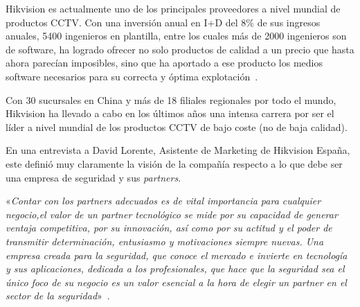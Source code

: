 Hikvision es actualmente uno de los principales proveedores a nivel mundial de productos \acs{CCTV}. Con una inversión anual en \acs{I+D} del 8\% de sus ingresos anuales, 5400 ingenieros en plantilla, entre los cuales más de 2000 ingenieros son de software, ha logrado ofrecer no solo productos de calidad a un precio que hasta ahora parecían imposibles, sino que ha aportado a ese producto los medios software necesarios para su correcta y óptima explotación~\cite{HikEurope}.

Con 30 sucursales en China y más de 18 filiales regionales por todo el mundo, Hikvision ha llevado a cabo en los últimos años una intensa carrera por ser el líder a nivel mundial de los productos \acs{CCTV} de bajo coste (no de baja calidad).

En una entrevista a David Lorente, Asistente de Marketing de Hikvision España, este definió muy claramente la visión de la compañía respecto a lo que debe ser una empresa de seguridad y sus \textit{partners}.


«\textit{Contar con los partners adecuados es de vital importancia para cualquier negocio,el valor de un partner tecnológico se mide por su capacidad de generar ventaja competitiva, por su innovación, así como por su actitud y el poder de transmitir determinación, entusiasmo y motivaciones siempre
nuevas. Una empresa creada para la seguridad, que conoce el mercado e invierte en tecnología y sus aplicaciones, dedicada a los profesionales, que hace que la seguridad sea el único foco de su
negocio es un valor esencial a la hora de elegir un partner en el sector de la seguridad}»~\cite{HikSpain}.





